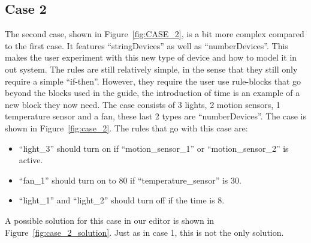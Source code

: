 \documentclass[11pt,a4paper]{report}
\begin{document}
\subsection{Case 2}
The second case, shown in Figure~\ref{fig:CASE_2}, is a bit more complex compared to the first case. It features ``stringDevices'' as well as ``numberDevices''. This makes the user experiment with this new type of device and how to model it in out system. The rules are still relatively simple, in the sense that they still only require a simple ``if-then''. However, they require the user use rule-blocks that go beyond the blocks used in the guide, the introduction of time is an example of a new block they now need. The case consists of 3 lights, 2 motion sensors, 1 temperature sensor and a fan, these last 2 types are ``numberDevices''. The case is shown in Figure~\ref{fig:case_2}. The rules that go with this case are:
\begin{itemize}
    \item ``light\_3'' should turn on if ``motion\_sensor\_1'' or ``motion\_sensor\_2'' is active.
    \item ``fan\_1'' should turn on to 80 if ``temperature\_sensor'' is 30.
    \item ``light\_1'' and ``light\_2'' should turn off if the time is 8.
\end{itemize}
A possible solution for this case in our editor is shown in Figure~\ref{fig:case_2_solution}. Just as in case 1, this is not the only solution.
\end{document}
